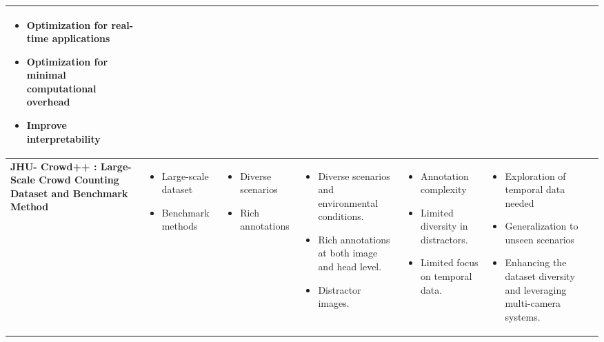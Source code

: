 \documentclass{article}
\begin{document}
\begin{adjustbox}{width=\textwidth}
\begin{tabular}{|p{}|p{}|p{}|p{}|p{}|p{}|}
    \begin{itemize}[leftmargin=*]
        \item Optimization for real-time applications 
        \item  Optimization for minimal computational overhead
        \item Improve interpretability
    \end{itemize} \\
    \hline
     \vspace{0.1in}
   \large \textbf{ JHU- Crowd++ : Large-Scale Crowd Counting Dataset and Benchmark Method} & 
    \begin{itemize}[leftmargin=*]
        \item Large-scale dataset
        \item Benchmark methods
    \end{itemize} & 
    \begin{itemize}[leftmargin=*]
        \item Diverse scenarios
        \item Rich annotations
    \end{itemize} & 
    \begin{itemize}[leftmargin=*]
        \item Diverse scenarios and environmental conditions.  
        \item Rich annotations at both image and head level.
        \item Distractor images.
    \end{itemize} & 
    \begin{itemize}[leftmargin=*]
        \item Annotation complexity
        \item Limited diversity in distractors.
        \item Limited focus on temporal data.
    \end{itemize} & 
    \begin{itemize}[leftmargin=*]
        \item Exploration of temporal data needed
        \item Generalization to unseen scenarios
        \item Enhancing the dataset diversity and leveraging multi-camera systems.
    \end{itemize} \\
    \hline
\end{tabular}
\end{adjustbox}
\end{document}
